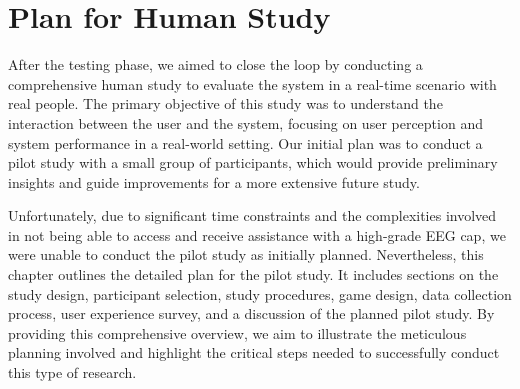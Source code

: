 \chapter{Plan for Human Study}\label{ch:human_study}


After the testing phase, we aimed to close the loop by conducting a comprehensive human study to evaluate the system in a real-time scenario with real people. 
The primary objective of this study was to understand the interaction between the user and the system, focusing on user perception and system performance in a real-world setting. 
Our initial plan was to conduct a pilot study with a small group of participants, which would provide preliminary insights and guide improvements for a more extensive future study.

Unfortunately, due to significant time constraints and the complexities involved in not being able to access and receive assistance with a high-grade EEG cap, we were unable to conduct the pilot study as initially planned. 
Nevertheless, this chapter outlines the detailed plan for the pilot study. 
It includes sections on the study design, participant selection, study procedures, game design, data collection process, user experience survey, and a discussion of the planned pilot study. 
By providing this comprehensive overview, we aim to illustrate the meticulous planning involved and highlight the critical steps needed to successfully conduct this type of research.

